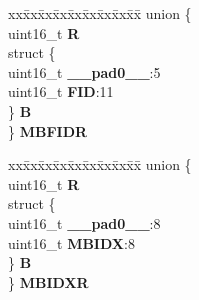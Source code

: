 \begin{DoxyCompactItemize}
\begin{tabbing}
\end{tabbing}\item 
\mbox{\label{structuMSG__BUFF__CCS_af4193212b3f344ff30087e5c2744583e}} 
\begin{tabbing}
xx\=xx\=xx\=xx\=xx\=xx\=xx\=xx\=xx\=\kill
union \{\\
\>uint16\_t {\bfseries R}\\
\>struct \{\\
\>\>uint16\_t {\bfseries \_\_pad0\_\_}:5\\
\>\>uint16\_t {\bfseries FID}:11\\
\>\} {\bfseries B}\\
\} {\bfseries MBFIDR}\\

\end{tabbing}\item 
\mbox{\label{structuMSG__BUFF__CCS_abbe70e970987894ac0ab6e81d69ceb13}} 
\begin{tabbing}
xx\=xx\=xx\=xx\=xx\=xx\=xx\=xx\=xx\=\kill
union \{\\
\>uint16\_t {\bfseries R}\\
\>struct \{\\
\>\>uint16\_t {\bfseries \_\_pad0\_\_}:8\\
\>\>uint16\_t {\bfseries MBIDX}:8\\
\>\} {\bfseries B}\\
\} {\bfseries MBIDXR}\\


\end{tabbing}
\end{DoxyCompactItemize}
